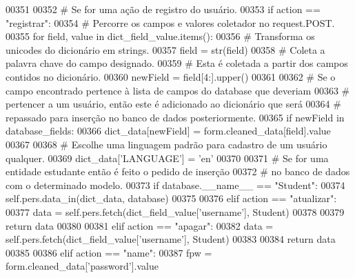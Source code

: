 \begin{DoxyCode}
00351 
00352         \textcolor{comment}{# Se for uma ação de registro do usuário.}
00353         \textcolor{keywordflow}{if} action == \textcolor{stringliteral}{"registrar"}: 
00354             \textcolor{comment}{# Percorre os campos e valores coletador no request.POST.}
00355             \textcolor{keywordflow}{for} field, value \textcolor{keywordflow}{in} dict\_field\_value.items():
00356                 \textcolor{comment}{# Transforma os unicodes do dicionário em strings.}
00357                 field = str(field)
00358                 \textcolor{comment}{# Coleta a palavra chave do campo designado.}
00359                 \textcolor{comment}{#   Esta é coletada a partir dos campos contidos no dicionário.}
00360                 newField = field[4:].upper()
00361 
00362                 \textcolor{comment}{# Se o campo encontrado pertence à lista de campos do database que deveriam}
00363                 \textcolor{comment}{# pertencer a um usuário, então este é adicionado ao dicionário que será}
00364                 \textcolor{comment}{# repassado para inserção no banco de dados posteriormente.}
00365                 \textcolor{keywordflow}{if} newField \textcolor{keywordflow}{in} database\_fields:
00366                     dict\_data[newField] = form.cleaned\_data[field].value
00367 
00368             \textcolor{comment}{# Escolhe uma linguagem padrão para cadastro de um usuário qualquer.}
00369             dict\_data[\textcolor{stringliteral}{'LANGUAGE'}] = \textcolor{stringliteral}{'en'}
00370 
00371             \textcolor{comment}{# Se for uma entidade estudante então é feito o pedido de inserção }
00372             \textcolor{comment}{# no banco de dados com o determinado modelo.}
00373             \textcolor{keywordflow}{if} database.\_\_name\_\_ == \textcolor{stringliteral}{"Student"}:
00374                 self.pers.data\_in(dict\_data, database)
00375 
00376         \textcolor{keywordflow}{elif} action == \textcolor{stringliteral}{"atualizar"}:
00377             data = self.pers.fetch(dict\_field\_value[\textcolor{stringliteral}{'username'}], Student)
00378 
00379             \textcolor{keywordflow}{return} data
00380 
00381         \textcolor{keywordflow}{elif} action == \textcolor{stringliteral}{"apagar"}:
00382             data = self.pers.fetch(dict\_field\_value[\textcolor{stringliteral}{'username'}], Student)
00383 
00384             \textcolor{keywordflow}{return} data
00385 
00386         \textcolor{keywordflow}{elif} action == \textcolor{stringliteral}{"name"}:
00387             fpw = form.cleaned\_data[\textcolor{stringliteral}{'password'}].value

\end{DoxyCode}
